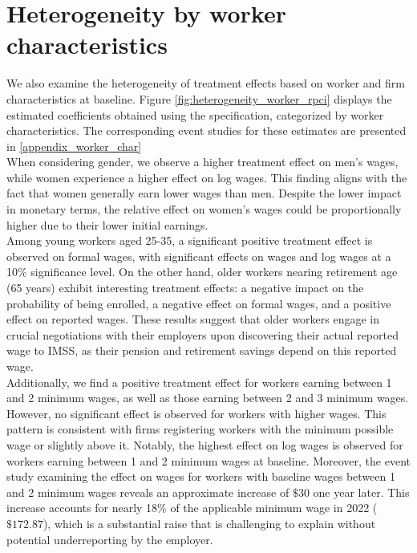 \documentclass[10pt, oneside]{book}
\begin{document}
\normalsize

\section{Heterogeneity by worker characteristics}

We also examine the heterogeneity of treatment effects based on worker and firm characteristics at baseline. Figure \ref{fig:heterogeneity_worker_rpci} displays the estimated coefficients obtained using the \cite{de2020two} specification, categorized by worker characteristics. The corresponding event studies for these estimates are presented in \ref{appendix_worker_char} \\

When considering gender, we observe a higher treatment effect on men's wages, while women experience a higher effect on log wages. This finding aligns with the fact that women generally earn lower wages than men. Despite the lower impact in monetary terms, the relative effect on women's wages could be proportionally higher due to their lower initial earnings. \\

Among young workers aged 25-35, a significant positive treatment effect is observed on formal wages, with significant effects on wages and log wages at a 10\% significance level. On the other hand, older workers nearing retirement age (65 years) exhibit interesting treatment effects: a negative impact on the probability of being enrolled, a negative effect on formal wages, and a positive effect on reported wages. These results suggest that older workers engage in crucial negotiations with their employers upon discovering their actual reported wage to IMSS, as their pension and retirement savings depend on this reported wage. \\

Additionally, we find a positive treatment effect for workers earning between 1 and 2 minimum wages, as well as those earning between 2 and 3 minimum wages. However, no significant effect is observed for workers with higher wages. This pattern is consistent with firms registering workers with the minimum possible wage or slightly above it. Notably, the highest effect on log wages is observed for workers earning between 1 and 2 minimum wages at baseline. Moreover, the event study examining the effect on wages for workers with baseline wages between 1 and 2 minimum wages reveals an approximate increase of $ \$30$ one year later. This increase accounts for nearly 18\% of the applicable minimum wage in 2022 ($\$172.87$), which is a substantial raise that is challenging to explain without potential underreporting by the employer. \\
\end{document}
